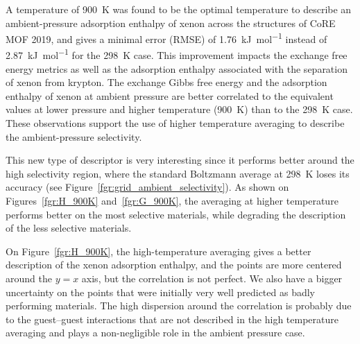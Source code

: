 \documentclass[main]{subfiles}
\begin{document}
A temperature of \SI{900}{\kelvin} was found to be the optimal temperature to describe an ambient-pressure adsorption enthalpy of xenon across the structures of CoRE MOF 2019, and gives a minimal error (RMSE) of \SI{1.76}{\kilo\joule\per\mole} instead of \SI{2.87}{\kilo\joule\per\mole} for the \SI{298}{\kelvin} case. This improvement impacts the exchange free energy metrics as well as the adsorption enthalpy associated with the separation of xenon from krypton. The exchange Gibbs free energy and the adsorption enthalpy of xenon at ambient pressure are better correlated to the equivalent values at lower pressure and higher temperature (\SI{900}{\kelvin}) than to the \SI{298}{\kelvin} case. These observations support the use of higher temperature averaging to describe the ambient-pressure selectivity.

This new type of descriptor is very interesting since it performs better around the high selectivity region, where the standard Boltzmann average at \SI{298}{\kelvin} loses its accuracy (see Figure~\ref{fgr:grid_ambient_selectivity}). As shown on Figures~\ref{fgr:H_900K} and~\ref{fgr:G_900K}, the averaging at higher temperature performs better on the most selective materials, while degrading the description of the less selective materials.

On Figure~\ref{fgr:H_900K}, the high-temperature averaging gives a better description of the xenon adsorption enthalpy, and the points are more centered around the $y=x$ axis, but the correlation is not perfect. We also have a bigger uncertainty on the points that were initially very well predicted as badly performing materials. The high dispersion around the correlation is probably due to the guest--guest interactions that are not described in the high temperature averaging and plays a non-negligible role in the ambient pressure case.
\end{document}
